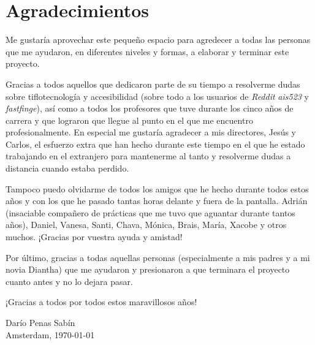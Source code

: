 %
%

\section*{Agradecimientos}

Me gustaría aprovechar este pequeño espacio para agredecer a todas las personas que me ayudaron, en diferentes niveles y formas, a elaborar y terminar este proyecto.

Gracias a todos aquellos que dedicaron parte de su tiempo a resolverme dudas sobre tiflotecnología y accesibilidad (sobre todo a los usuarios de \textit{Reddit} \textit{ais523} y \textit{fastfinge}), así como a todos los profesores que tuve durante los cinco años de carrera y que lograron que llegue al punto en el que me encuentro profesionalmente. En especial me gustaría agradecer a mis directores, Jesús y Carlos, el esfuerzo extra que han hecho durante este tiempo en el que he estado trabajando en el extranjero para mantenerme al tanto y resolverme dudas a distancia cuando estaba perdido.

Tampoco puedo olvidarme de todos los amigos que he hecho durante todos estos años y con los que he pasado tantas horas delante y fuera de la pantalla. Adrián (insaciable compañero de prácticas que me tuvo que aguantar durante tantos años), Daniel, Vanesa, Santi, Chava, Mónica, Brais, María, Xacobe y otros muchos. ¡Gracias por vuestra ayuda y amistad!

Por último, gracias a todas aquellas personas (especialmente a mis padres y a mi novia Diantha) que me ayudaron y presionaron a que terminara el proyecto cuanto antes y no lo dejara pasar.

¡Gracias a todos por todos estos maravillosos años!

\begin{flushright}
  Darío Penas Sabín \\
  Amsterdam, \today
\end{flushright}

